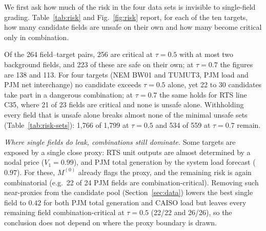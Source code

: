 We first ask how much of the risk in the four data sets is invisible to single-field grading.
Table~\ref{tab:risk} and Fig.~\ref{fig:risk} report, for each of the ten targets, how many
candidate fields are unsafe on their own and how many become critical only in combination.

Of the 264 field--target
pairs, 256 are critical at $\tau=0.5$ with at most two background fields, and 223 of these are
safe on their own; at $\tau=0.7$ the figures are 138 and 113. For four targets (NEM BW01 and
TUMUT3, PJM load and PJM net interchange) no candidate exceeds $\tau=0.5$ alone, yet 22 to 30
candidates take part in a dangerous combination; at $\tau=0.7$ the same holds for RTS line C35,
where 21 of 23 fields are critical and none is unsafe alone. Withholding every field that is unsafe alone
breaks almost none of the minimal unsafe sets (Table~\ref{tab:risk-sets}): 1,766 of 1,799 at $\tau=0.5$
and 534 of 559 at $\tau=0.7$ remain.

\emph{Where single fields do leak, combinations still dominate.} Some targets are exposed by a
single close proxy: RTS unit outputs are almost determined by a nodal price ($V_1=0.99$), and
PJM total generation by the system load forecast ($0.97$). For these, $M^{(0)}$ already flags
the proxy, and the remaining risk is again combinatorial (e.g.\ 22 of 24 PJM fields are
combination-critical). Removing such near-proxies from the candidate pool
(Section~\ref{sec:data}) lowers the best single field to $0.42$ for both PJM total generation
and CAISO load but leaves every remaining field combination-critical at $\tau=0.5$ (22/22 and
26/26), so the conclusion does not depend on where the proxy boundary is drawn.
